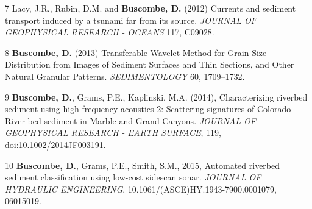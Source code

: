 \documentclass[margin,line]{resume}
\begin{document}
\begin{resume}
\begin{footnotesize}
\begin{list1}
	\item[7] Lacy, J.R., Rubin, D.M. and {\bf Buscombe, D.} (2012) Currents and sediment transport induced by a tsunami far from its source. {\sl JOURNAL OF GEOPHYSICAL RESEARCH - OCEANS} 117, C09028.\\

    \item[8] {\bf Buscombe, D.} (2013) Transferable Wavelet Method for Grain Size-Distribution from Images of Sediment Surfaces and Thin Sections, and Other Natural Granular Patterns. {\sl SEDIMENTOLOGY} 60, 1709--1732.\\


	\item[9] {\bf Buscombe, D.}, Grams, P.E., Kaplinski, M.A. (2014), Characterizing riverbed sediment using high-frequency acoustics 2: Scattering signatures of Colorado River bed sediment in Marble and Grand Canyons. {\sl JOURNAL OF GEOPHYSICAL RESEARCH - EARTH SURFACE}, 119, doi:10.1002/2014JF003191.\\

	\item[10] {\bf Buscombe, D.}, Grams, P.E., Smith, S.M., 2015, Automated riverbed sediment classification using low-cost sidescan sonar. {\sl JOURNAL OF HYDRAULIC ENGINEERING}, 10.1061/(ASCE)HY.1943-7900.0001079, 06015019.\\

	\end{list1}
        \end{footnotesize}
        

\end{resume}
\end{document}
